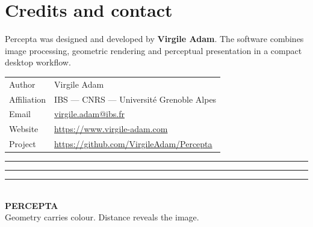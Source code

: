 \documentclass[10.5pt,a4paper]{article}
\newcommand{\RGBbar}{\textcolor{PR}{\rule{0.32\linewidth}{2.3pt}}\hspace{-1pt}\textcolor{PG}{\rule{0.32\linewidth}{2.3pt}}\hspace{-1pt}\textcolor{PB}{\rule{0.32\linewidth}{2.3pt}}}
\begin{document}
\section*{Credits and contact}
Percepta was designed and developed by \textbf{Virgile Adam}. The software combines image processing, geometric rendering and perceptual presentation in a compact desktop workflow.

\begin{tabularx}{\linewidth}{@{}lX@{}}
\toprule
Author & Virgile Adam \\
Affiliation & IBS --- CNRS --- Universit\'e Grenoble Alpes \\
Email & \href{mailto:virgile.adam@ibs.fr}{virgile.adam@ibs.fr} \\
Website & \href{https://www.virgile-adam.com}{https://www.virgile-adam.com} \\
Project & \href{https://github.com/VirgileAdam/Percepta}{https://github.com/VirgileAdam/Percepta} \\
\bottomrule
\end{tabularx}

\vfill
\begin{center}
\RGBbar\\[5mm]
{\large\bfseries\color{Ink}PERCEPTA}\\[1mm]
{\small\color{Muted}Geometry carries colour. Distance reveals the image.}
\end{center}
\end{document}

